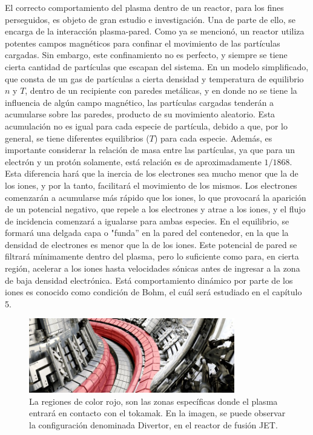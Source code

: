 \documentclass[../main.tex]{subfiles}
\begin{document}
    
El correcto comportamiento del plasma dentro de un reactor, para los fines perseguidos, es objeto de gran estudio e investigación. Una de parte de ello, se encarga de la interacción plasma-pared. Como ya se mencionó, un reactor utiliza potentes campos magnéticos para confinar el movimiento de las partículas cargadas. Sin embargo, este confinamiento no es perfecto, y siempre se tiene cierta cantidad de partículas que escapan del sistema. En un modelo simplificado, que consta de un gas de partículas a cierta densidad y temperatura de equilibrio $n$ y $T$, dentro de un recipiente con paredes metálicas, y en donde no se tiene la influencia de algún campo magnético, las partículas cargadas tenderán a acumularse sobre las paredes, producto de su movimiento aleatorio. Esta acumulación no es igual para cada especie de partícula, debido a que, por lo general, se tiene diferentes equilibrios ($T$) para cada especie. Además, es importante considerar la relación de masa entre las partículas, ya que para un electrón y un protón solamente, está relación es de aproximadamente $1/1868$. Esta diferencia hará que la inercia de los electrones sea mucho menor que la de los iones, y por la tanto, facilitará el movimiento de los mismos. Los electrones comenzarán a acumularse más rápido que los iones, lo que provocará la aparición de un potencial negativo, que repele a los electrones y atrae  a los iones, y el flujo de incidencia comenzará a igualarse para ambas especies. En el equilibrio, se formará una delgada capa o "funda'' en la pared del contenedor, en la que la densidad de electrones es menor que la de los iones. Este potencial de pared se filtrará mínimamente dentro del plasma, pero lo suficiente como para, en cierta región, acelerar a los iones hasta velocidades sónicas antes de ingresar a la zona de baja densidad electrónica. Está comportamiento dinámico por parte de los iones es conocido como condición de Bohm, el cuál será estudiado en el capítulo 5. \\

\begin{figure}[h] 
        \label{fig:figura2.1}
        \centering
        \includegraphics[width=0.8\textwidth]{Images/divertor_jet.jpg}
        \caption{La regiones de color rojo, son las zonas específicas donde el plasma entrará en contacto con el tokamak. En la imagen, se puede observar la configuración denominada Divertor, en el reactor de fusión JET. }
\end{figure}
\newpage
\end{document}

